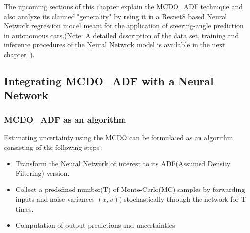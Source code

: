 	The upcoming sections of this chapter explain the MCDO\_ADF technique  and also analyze its claimed "generality" by using it in a Resnet8 based Neural Network regression model meant for the application of steering-angle prediction in autonomous cars.(Note: A detailed description of the data set, training and inference procedures of the Neural Network model is available in the next chapter[]).  
	
	
    \subsection{Integrating MCDO\_ADF with a Neural Network}
    \subsubsection{MCDO\_ADF as an algorithm}
    Estimating uncertainty using the MCDO can be formulated as an algorithm consisting of the following steps:
    \begin{itemize}
    	\item Transform the Neural Network of interest to its ADF(Assumed Density Filtering) version.
    	\item Collect a predefined number(T) of Monte-Carlo(MC) samples by forwarding inputs and noise variances $(x,v))$ stochastically through the network for T times.
    	\item Computation of output predictions and uncertainties  
    \end{itemize}
